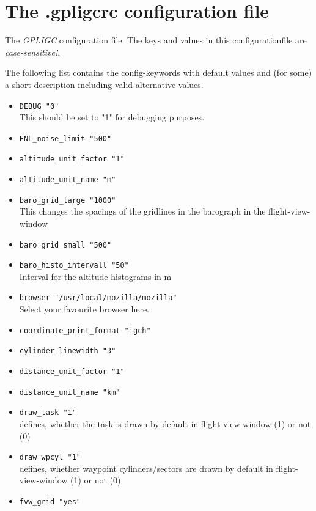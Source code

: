 

\section{The .gpligcrc configuration file}
\label{gpligcrc}
The \emph{GPLIGC} configuration file.
The keys and values in this configurationfile are \emph{case-sensitive!}.

The following list contains the config-keywords with default values and (for some)
a short description including valid alternative values.


\begin{itemize}

\item \texttt{DEBUG    "0"} \\
 This should be set to "1" for debugging purposes.

\item \texttt{ENL\_noise\_limit    "500"}
\item \texttt{altitude\_unit\_factor    "1"}
\item \texttt{altitude\_unit\_name    "m"}
\item \texttt{baro\_grid\_large    "1000"} \\
 This changes the spacings of the gridlines in the barograph in the flight-view-window
\item \texttt{baro\_grid\_small    "500"}
\item \texttt{baro\_histo\_intervall    "50"}\\
    Interval for the altitude histograms in m
\item \texttt{browser    "/usr/local/mozilla/mozilla"}\\
 Select your favourite browser here.
\item \texttt{coordinate\_print\_format    "igch"}
\item \texttt{cylinder\_linewidth    "3"}
\item \texttt{distance\_unit\_factor    "1"}
\item \texttt{distance\_unit\_name    "km"}
\item \texttt{draw\_task "1"} \\
defines, whether the task is drawn by default in flight-view-window (1) or not (0)
\item \texttt{draw\_wpcyl "1"}\\
defines, whether waypoint cylinders/sectors are drawn by default in flight-view-window (1) or not (0)
\item \texttt{fvw\_grid    "yes"}


\end{itemize}
